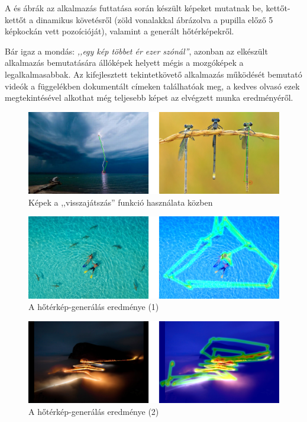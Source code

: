 \bigskip

A   és  ábrák az alkalmazás futtatása során készült képeket mutatnak be, kettőt-kettőt a dinamikus követésről (zöld vonalakkal ábrázolva a pupilla előző 5 képkockán vett pozoícióját), valamint a generált hőtérképekről.

Bár igaz a mondás: \emph{,,egy kép többet ér ezer szónál''}, azonban az elkészült alkalmazás bemutatására állóképek helyett mégis a mozgóképek a legalkalmasabbak. Az kifejlesztett tekintetkövető alkalmazás működését bemutató videók a  függelékben dokumentált címeken találhatóak meg, a kedves olvasó ezek megtekintésével alkothat még teljesebb képet az elvégzett munka eredményéről.

\begin{figure}[!ht]
\centering
\includegraphics[width=150mm, keepaspectratio]{figures/vegleges_vonal.png}
\caption{Képek a ,,visszajátszás'' funkció használata közben}
\label{fig:vegleges_vonal}
\end{figure}

\begin{figure}[!ht]
\centering
\includegraphics[width=150mm, keepaspectratio]{figures/vegleges_heat1.png}
\caption{A hőtérkép-generálás eredménye (1)}
\label{fig:vegleges_heat1}
\end{figure}

\begin{figure}[!ht]
\centering
\includegraphics[width=150mm, keepaspectratio]{figures/vegleges_heat2.png}
\caption{A hőtérkép-generálás eredménye (2)}
\label{fig:vegleges_heat2}
\end{figure}